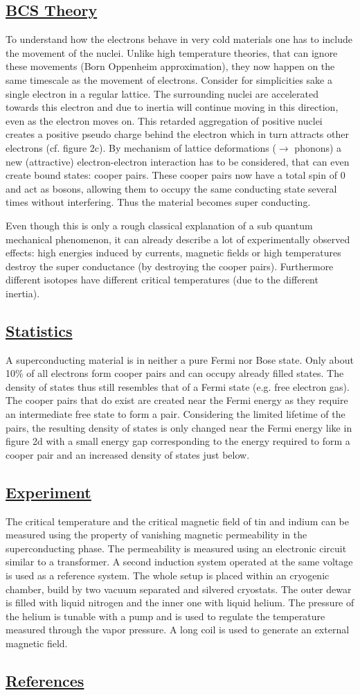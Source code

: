 \documentclass[a4paper]{scrartcl}
\numberwithin{equation}{section}
\numberwithin{figure}{section}
\numberwithin{table}{section}
\newcommand{\ssubsection}[1]{{ \subsection*{\linebreak \centering\bf\underline {#1}}}}
\renewcommand\refname{}
\begin{document}
\ssubsection{BCS Theory}
To understand how the electrons behave in very cold materials one has to include the movement of the nuclei. Unlike high temperature theories, that can ignore these movements (Born Oppenheim approximation), they now happen on the same timescale as the movement of electrons. Consider for simplicities sake a single electron in a regular lattice. The surrounding nuclei are accelerated towards this electron and due to inertia will continue moving in this direction, even as the electron moves on. This retarded aggregation of positive nuclei creates a positive pseudo charge behind the electron which in turn attracts other electrons (cf. figure 2c). By mechanism of lattice deformations ($\rightarrow$ phonons) a new (attractive) electron-electron interaction has to be considered, that can even create bound states: cooper pairs. These cooper pairs now have a total spin of 0 and act as bosons, allowing them to occupy the same conducting state several times without interfering. Thus the material becomes super conducting.

Even though this is only a rough classical explanation of a sub quantum mechanical phenomenon, it can already describe a lot of experimentally observed effects: high energies induced by currents, magnetic fields or high temperatures destroy the super conductance (by destroying the cooper pairs). Furthermore different isotopes have different critical temperatures (due to the different inertia).

\ssubsection{Statistics}
A superconducting material is in neither a pure Fermi nor Bose state. Only about 10\% of all electrons form cooper pairs and can occupy already filled states. The density of states thus still resembles that of a Fermi state (e.g. free electron gas). The cooper pairs that do exist are created near the Fermi energy as they require an intermediate free state to form a pair. Considering the limited lifetime of the pairs, the resulting density of states is only changed near the Fermi energy like in figure 2d with a small energy gap corresponding to the energy required to form a cooper pair and an increased density of states just below.

\ssubsection{Experiment} 
The critical temperature and the critical magnetic field of tin and indium can be measured using the property of vanishing magnetic permeability in the superconducting phase. The permeability is measured using an electronic circuit similar to a transformer. A second induction system operated at the same voltage is used as a reference system. The whole setup is placed within an cryogenic chamber, build by two vacuum separated and silvered cryostats. The outer dewar is filled with liquid nitrogen and the inner one with liquid helium. The pressure of the helium is tunable with a pump and is used to regulate the temperature measured through the vapor pressure. A long coil is used to generate an external magnetic field.

\ssubsection{References}
\vspace*{-1cm}
\nocite{buckel}
\nocite{tinkham}
\nocite{BCS}
\nocite{GL}
\nocite{hofmann}
\renewcommand\refname{}


\end{document}

